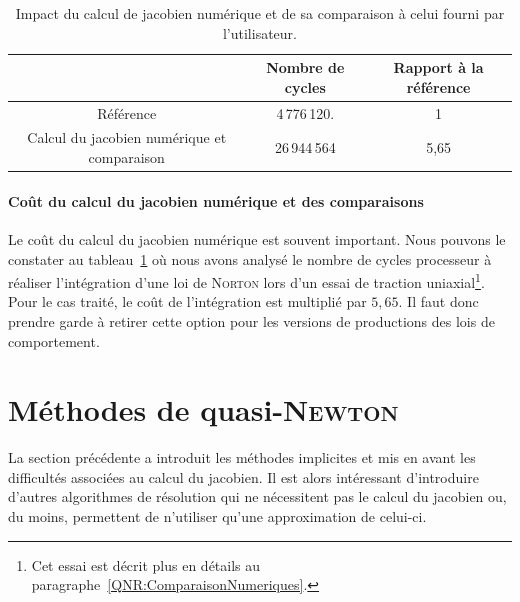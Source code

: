 \documentclass[12pt]{article}
\begin{document}
\begin{table}
  \centering
  \begin{tabular}{|c|c|c|}
    \cline{2-3}
    \multicolumn{1}{c|}{} & 
    \begin{minipage}{4cm}
      Nombre de cycles
    \end{minipage} &
    \begin{minipage}{4cm}
      Rapport à la référence
    \end{minipage} \\
    \hline
    Référence             & 4\,776\,120. & 1 \\
    \hline
    \begin{minipage}[p]{4cm}
    Calcul du jacobien numérique et comparaison  
    \end{minipage}
    & 26\,944\,564 & 5,65\\
    \hline
  \end{tabular}
  \label{tab:NR:nJ}
  \caption{Impact du calcul de jacobien numérique et de sa comparaison à
    celui fourni par l'utilisateur.}
\end{table}

\paragraph{Coût du calcul du jacobien numérique et des comparaisons} Le
  coût du calcul du jacobien numérique est souvent important. Nous
  pouvons le constater au tableau~\ref{tab:NR:nJ} où nous avons analysé
  le nombre de cycles processeur à réaliser l'intégration d'une loi de
  \textsc{Norton} lors d'un essai de traction uniaxial\footnote{Cet
  essai est décrit plus en détails au
  paragraphe~\ref{QNR:ComparaisonNumeriques}.}. Pour le cas traité,
le coût de l'intégration est multiplié par \(5,65\). Il faut donc
prendre garde à retirer cette option pour les versions de productions
des lois de comportement.

\clearpage
\newpage
\section{Méthodes de quasi-\textsc{Newton}}

La section précédente a introduit les méthodes implicites et mis en
avant les difficultés associées au calcul du jacobien. Il est alors
intéressant d'introduire d'autres algorithmes de résolution qui ne
nécessitent pas le calcul du jacobien ou, du moins, permettent de
n'utiliser qu'une approximation de celui-ci.
\end{document}

